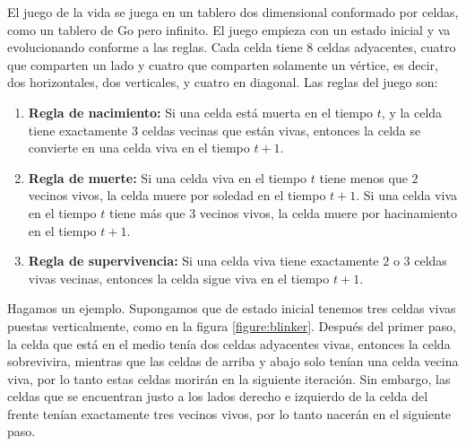 El juego de la vida se juega en un tablero dos dimensional conformado por celdas, como un tablero de Go pero infinito. El juego empieza con un estado inicial y va evolucionando conforme a las reglas. Cada celda tiene 8 celdas adyacentes, cuatro que comparten un lado y cuatro que comparten solamente un v\'ertice, es decir, dos horizontales, dos verticales, y cuatro en diagonal. Las reglas del juego son:

\begin{enumerate}
    \item \textbf{Regla de nacimiento:} Si una celda est\'a muerta en el tiempo $t$, y la celda tiene exactamente $3$ celdas vecinas que est\'an vivas, entonces la celda se convierte en una celda viva en el tiempo $t+1$.
    \item \textbf{Regla de muerte:} Si una celda viva en el tiempo $t$ tiene menos que $2$ vecinos vivos, la celda muere por soledad en el tiempo $t+1$. Si una celda viva en el tiempo $t$ tiene m\'as que $3$ vecinos vivos, la celda muere por hacinamiento en el tiempo $t+1$.
    \item \textbf{Regla de supervivencia:} Si una celda viva tiene exactamente $2$ o $3$ celdas vivas vecinas, entonces la celda sigue viva en el tiempo $t+1$.
\end{enumerate}

Hagamos un ejemplo. Supongamos que de estado inicial tenemos tres celdas vivas puestas verticalmente, como en la figura \ref{figure:blinker}. Despu\'es del primer paso, la celda que est\'a en el medio ten\'ia dos celdas adyacentes vivas, entonces la celda sobrevivira, mientras que las celdas de arriba y abajo solo ten\'ian una celda vecina viva, por lo tanto estas celdas morir\'an en la siguiente iteraci\'on. Sin embargo, las celdas que se encuentran justo a los lados derecho e izquierdo de la celda del frente ten\'ian exactamente tres vecinos vivos, por lo tanto nacer\'an en el siguiente paso.

